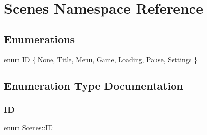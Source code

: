 \hypertarget{namespace_scenes}{}\section{Scenes Namespace Reference}
\label{namespace_scenes}
\subsection*{Enumerations}
\begin{DoxyCompactItemize}
\item 
enum \hyperlink{namespace_scenes_a0ad7ab6856b1d77d498e3a251f6bb275}{ID} \{ \newline
\hyperlink{namespace_scenes_a0ad7ab6856b1d77d498e3a251f6bb275a62ed6cc2cc350c0b2f007bba07e0aac6}{None}, 
\hyperlink{namespace_scenes_a0ad7ab6856b1d77d498e3a251f6bb275a777d5475dda0030fdd34a9f736b5891a}{Title}, 
\hyperlink{namespace_scenes_a0ad7ab6856b1d77d498e3a251f6bb275a8c6d665468f36f79d9f0b1d02ec46b74}{Menu}, 
\hyperlink{namespace_scenes_a0ad7ab6856b1d77d498e3a251f6bb275a1c09bc977521c21c5bd955eca43c24f1}{Game}, 
\newline
\hyperlink{namespace_scenes_a0ad7ab6856b1d77d498e3a251f6bb275aa64f4adb0e245eb77f79e2cf3c2c10e7}{Loading}, 
\hyperlink{namespace_scenes_a0ad7ab6856b1d77d498e3a251f6bb275a554bcf6b884325cfc3097b9d12f3d97b}{Pause}, 
\hyperlink{namespace_scenes_a0ad7ab6856b1d77d498e3a251f6bb275a81c375e87af8f99a546d728ce60e4620}{Settings}
 \}
\end{DoxyCompactItemize}


\subsection{Enumeration Type Documentation}
\hypertarget{namespace_scenes_a0ad7ab6856b1d77d498e3a251f6bb275}{}\label{namespace_scenes_a0ad7ab6856b1d77d498e3a251f6bb275} 
\subsubsection{\texorpdfstring{ID}{ID}}
{\footnotesize\ttfamily enum \hyperlink{namespace_scenes_a0ad7ab6856b1d77d498e3a251f6bb275}{Scenes\+::\+ID}}

